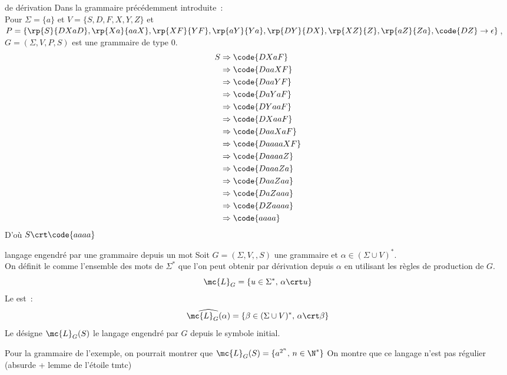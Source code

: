 \begin{adjustwidth}{-3cm}{-3cm}
\begin{exemple}{}{de dérivation}
    Dans la grammaire précédemment introduite~:\\
    Pour $\Sigma = \{a\}$ et $V = \{S,D,F,X,Y,Z\}$
    et $P = \{\rp{S}{DXaD},\rp{Xa}{aaX},\rp{XF}{YF},\rp{aY}{Ya},\rp{DY}{DX},\rp{XZ}{Z},\rp{aZ}{Za},\code{DZ}\to \epsilon\}$, $G = (\Sigma, V, P, S)$ est une grammaire de type 0.
    \begin{align*}
        S &\Rightarrow \code{DXaF} \\
        &\Rightarrow \code{DaaXF}\\
        &\Rightarrow \code{DaaYF}\\
        &\Rightarrow \code{DaYaF}\\
        &\Rightarrow \code{DYaaF}\\
        &\Rightarrow \code{DXaaF}\\
        &\Rightarrow \code{DaaXaF}\\
        &\Rightarrow \code{DaaaaXF}\\
        &\Rightarrow \code{DaaaaZ}\\
        &\Rightarrow \code{DaaaZa}\\
        &\Rightarrow \code{DaaZaa}\\
        &\Rightarrow \code{DaZaaa}\\
        &\Rightarrow \code{DZaaaa}\\
        &\Rightarrow \code{aaaa}
    \end{align*}
    D'où $S \crt \code{aaaa}$
\end{exemple}

\begin{definition}{}{langage engendré par une grammaire depuis un mot}
    Soit $G = (\Sigma, V, , S)$ une grammaire et $\alpha \in (\Sigma\cup V)^*$.\\
    On définit le  comme l'ensemble des mots de $\Sigma^*$ que l'on peut obtenir par dérivation depuis $\alpha$ en utilisant les règles de production de $G$.\\
    $$\mc{L}_G = \{u \in \Sigma^*,\, \alpha \crt u\}$$
    Le  est~:
    $$\widehat{\mc{L}_G(\alpha)} = \{\beta \in (\Sigma \cup V)^*,\, \alpha \crt \beta\}$$
    Le  désigne $\mc{L}_G(S)$ le langage engendré par $G$ depuis le symbole initial.
\end{definition}

\begin{exemple}{}{}
    Pour la grammaire de l'exemple, on pourrait montrer que $\mc{L}_G(S) = \{a^{2^n},\, n \in \N^*\}$
    On montre que ce langage n'est pas régulier (absurde + lemme de l'étoile tmtc)
\end{exemple}


\end{adjustwidth}
